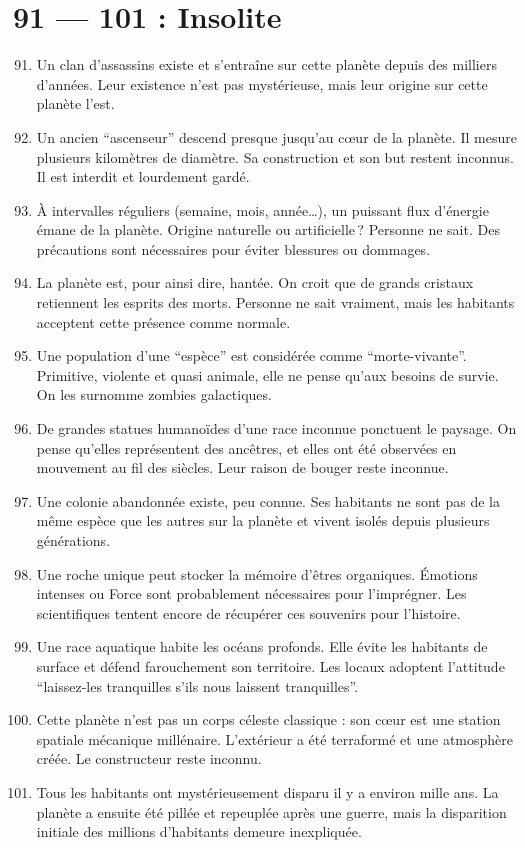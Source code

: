 \documentclass{article}
\begin{document}
\section*{91 --- 101 : Insolite}
\begin{enumerate}
	\setcounter{enumi}{90}
	\item Un clan d’assassins existe et s’entraîne sur cette planète depuis des milliers d’années. Leur existence n’est pas mystérieuse, mais leur origine sur cette planète l’est.
	\item Un ancien “ascenseur” descend presque jusqu’au cœur de la planète. Il mesure plusieurs kilomètres de diamètre. Sa construction et son but restent inconnus. Il est interdit et lourdement gardé.
	\item À intervalles réguliers (semaine, mois, année…), un puissant flux d’énergie émane de la planète. Origine naturelle ou artificielle ? Personne ne sait. Des précautions sont nécessaires pour éviter blessures ou dommages.
	\item La planète est, pour ainsi dire, hantée. On croit que de grands cristaux retiennent les esprits des morts. Personne ne sait vraiment, mais les habitants acceptent cette présence comme normale.
	\item Une population d’une “espèce” est considérée comme “morte-vivante”. Primitive, violente et quasi animale, elle ne pense qu’aux besoins de survie. On les surnomme zombies galactiques.
	\item De grandes statues humanoïdes d’une race inconnue ponctuent le paysage. On pense qu’elles représentent des ancêtres, et elles ont été observées en mouvement au fil des siècles. Leur raison de bouger reste inconnue.
	\item Une colonie abandonnée existe, peu connue. Ses habitants ne sont pas de la même espèce que les autres sur la planète et vivent isolés depuis plusieurs générations.
	\item Une roche unique peut stocker la mémoire d’êtres organiques. Émotions intenses ou Force sont probablement nécessaires pour l’imprégner. Les scientifiques tentent encore de récupérer ces souvenirs pour l’histoire.
	\item Une race aquatique habite les océans profonds. Elle évite les habitants de surface et défend farouchement son territoire. Les locaux adoptent l’attitude “laissez-les tranquilles s’ils nous laissent tranquilles”.
	\item Cette planète n’est pas un corps céleste classique : son cœur est une station spatiale mécanique millénaire. L’extérieur a été terraformé et une atmosphère créée. Le constructeur reste inconnu.
	\item Tous les habitants ont mystérieusement disparu il y a environ mille ans. La planète a ensuite été pillée et repeuplée après une guerre, mais la disparition initiale des millions d’habitants demeure inexpliquée.
\end{enumerate}
\end{document}
